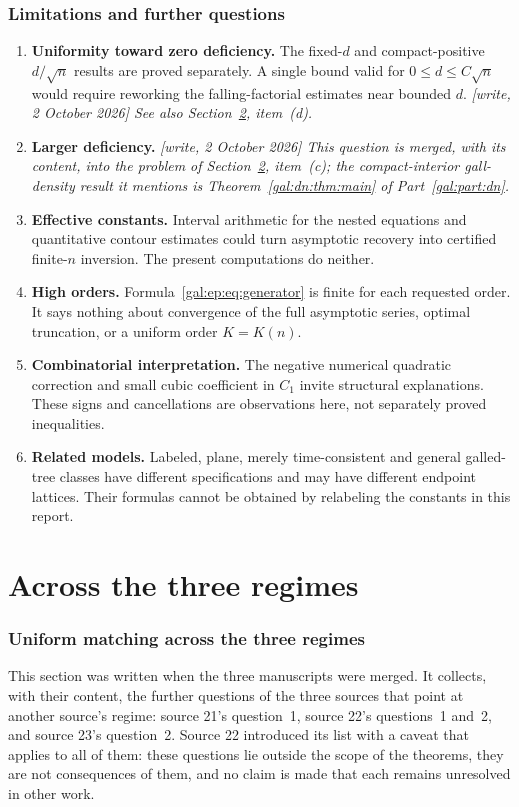 \documentclass[11pt,letterpaper]{article}
\numberwithin{equation}{section}
\theoremstyle{definition}\newtheorem{definition}[theorem]{Definition}
\theoremstyle{remark}\newtheorem{remark}[theorem]{Remark}
\begin{document}
\section{Limitations and further questions}\label{gal:ep:sec:limits}
\begin{enumerate}[leftmargin=*,itemsep=5pt]
\item \textbf{Uniformity toward zero deficiency.} The fixed-$d$ and compact-positive $d/\sqrt n$ results are proved separately. A single bound valid for $0\le d\le C\sqrt n$ would require reworking the falling-factorial estimates near bounded $d$. \emph{[write, 2 October 2026] See also Section~\ref{gal:sec:matching}, item~(d).}
\item \textbf{Larger deficiency.} \emph{[write, 2 October 2026] This question is merged, with its content, into the problem of Section~\ref{gal:sec:matching}, item~(c); the compact-interior gall-density result it mentions is Theorem~\ref{gal:dn:thm:main} of Part~\ref{gal:part:dn}.}
\item \textbf{Effective constants.} Interval arithmetic for the nested equations and quantitative contour estimates could turn asymptotic recovery into certified finite-$n$ inversion. The present computations do neither.
\item \textbf{High orders.} Formula~\eqref{gal:ep:eq:generator} is finite for each requested order. It says nothing about convergence of the full asymptotic series, optimal truncation, or a uniform order $K=K(n)$.
\item \textbf{Combinatorial interpretation.} The negative numerical quadratic correction and small cubic coefficient in $C_1$ invite structural explanations. These signs and cancellations are observations here, not separately proved inequalities.
\item \textbf{Related models.} Labeled, plane, merely time-consistent and general galled-tree classes have different specifications and may have different endpoint lattices. Their formulas cannot be obtained by relabeling the constants in this report.
\end{enumerate}

\part*{Across the three regimes}
\label{gal:part:match}
\section{Uniform matching across the three regimes}\label{gal:sec:matching}
This section was written when the three manuscripts were merged. It collects, with their content, the further questions of the three sources that point at another source's regime: source 21's question~1, source 22's questions~1 and~2, and source 23's question~2. Source 22 introduced its list with a caveat that applies to all of them: these questions lie outside the scope of the theorems, they are not consequences of them, and no claim is made that each remains unresolved in other work.
\end{document}

